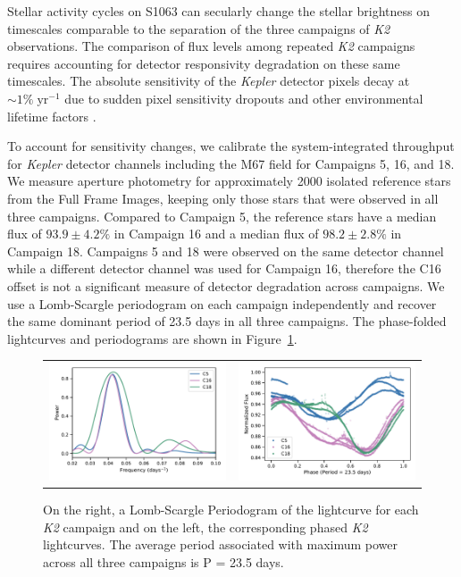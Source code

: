 \documentclass[trackchanges]{aastex631}
\begin{document}
Stellar activity cycles on S1063 can secularly change the stellar brightness on timescales comparable to the separation of the three campaigns of \emph{K2} observations.  The comparison of flux levels among repeated \emph{K2} campaigns requires accounting for detector responsivity degradation on these same timescales.  The absolute sensitivity of the \emph{Kepler} detector pixels decay at $\sim1 \%\;\textrm{yr}^{-1}$ due to sudden pixel sensitivity dropouts and other environmental lifetime factors \citep{montet17}.

To account for sensitivity changes, we calibrate the system-integrated throughput for \emph{Kepler} detector channels including the M67 field for Campaigns 5, 16, and 18. We measure aperture photometry for approximately 2000 isolated reference stars from the Full Frame Images, keeping only those stars that were observed in all three campaigns. Compared to Campaign 5, the reference stars have a median flux of $93.9\pm4.2\%$ in Campaign 16 and a median flux of $98.2\pm2.8\%$ in Campaign 18. Campaigns 5 and 18 were observed on the same detector channel while a different detector channel was used for Campaign 16, therefore the C16 offset is not a significant measure of detector degradation across campaigns. We use a Lomb-Scargle periodogram on each campaign independently and recover the same dominant period of 23.5 days in all three campaigns. The phase-folded lightcurves and periodograms are shown in Figure~\ref{fig:periodogram}.



\begin{figure}[ht]
    \centering
    \begin{tabular}{cc}
      \includegraphics[width=3in]{figures/AllCampaigns_Periodogram.pdf}   & \includegraphics[width=3in]{figures/AllCampaigns_Phased_Lightcurve.pdf}  \\
    \end{tabular}
    \caption{On the right, a Lomb-Scargle Periodogram of the lightcurve for each \emph{K2} campaign and on the left, the corresponding phased \emph{K2} lightcurves. The average period associated with maximum power across all three campaigns is P = 23.5 days.  }
    \label{fig:periodogram}
\end{figure}
\end{document}
